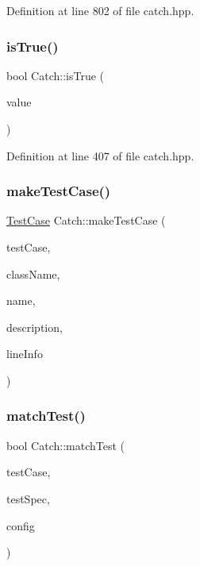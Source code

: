 Definition at line 802 of file catch.\+hpp.

\hypertarget{namespace_catch_ae3bc6c6677e64e6eaa720dc3add31852}{}\label{namespace_catch_ae3bc6c6677e64e6eaa720dc3add31852} 
\subsubsection{\texorpdfstring{is\+True()}{isTrue()}}
{\footnotesize\ttfamily bool Catch\+::is\+True (\begin{DoxyParamCaption}\item[{bool}]{value }\end{DoxyParamCaption})\hspace{0.3cm}{\ttfamily [inline]}}



Definition at line 407 of file catch.\+hpp.

\hypertarget{namespace_catch_a2a784590bb5068810d3f6013fed1f1d3}{}\label{namespace_catch_a2a784590bb5068810d3f6013fed1f1d3} 
\subsubsection{\texorpdfstring{make\+Test\+Case()}{makeTestCase()}}
{\footnotesize\ttfamily \hyperlink{class_catch_1_1_test_case}{Test\+Case} Catch\+::make\+Test\+Case (\begin{DoxyParamCaption}\item[{\hyperlink{struct_catch_1_1_i_test_case}{I\+Test\+Case} $\ast$}]{test\+Case,  }\item[{std\+::string const \&}]{class\+Name,  }\item[{std\+::string const \&}]{name,  }\item[{std\+::string const \&}]{description,  }\item[{\hyperlink{struct_catch_1_1_source_line_info}{Source\+Line\+Info} const \&}]{line\+Info }\end{DoxyParamCaption})}

\hypertarget{namespace_catch_aadef80fbc6bc84589777a462770cef49}{}\label{namespace_catch_aadef80fbc6bc84589777a462770cef49} 
\subsubsection{\texorpdfstring{match\+Test()}{matchTest()}}
{\footnotesize\ttfamily bool Catch\+::match\+Test (\begin{DoxyParamCaption}\item[{\hyperlink{class_catch_1_1_test_case}{Test\+Case} const \&}]{test\+Case,  }\item[{Test\+Spec const \&}]{test\+Spec,  }\item[{I\+Config const \&}]{config }\end{DoxyParamCaption})}

